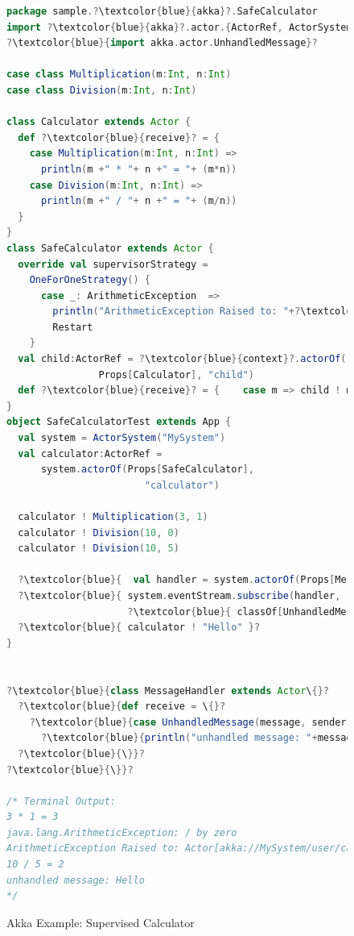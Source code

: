 \begin{figure}[p]

  \begin{lstlisting}[language=scala,   escapechar=?]
package sample.?\textcolor{blue}{akka}?.SafeCalculator
import ?\textcolor{blue}{akka}?.actor.{ActorRef, ActorSystem, Props, Actor}
?\textcolor{blue}{import akka.actor.UnhandledMessage}?

case class Multiplication(m:Int, n:Int)
case class Division(m:Int, n:Int)

class Calculator extends Actor {
  def ?\textcolor{blue}{receive}? = {
    case Multiplication(m:Int, n:Int) =>
      println(m +" * "+ n +" = "+ (m*n))
    case Division(m:Int, n:Int) =>
      println(m +" / "+ n +" = "+ (m/n))
  }
}
class SafeCalculator extends Actor {
  override val supervisorStrategy =
    OneForOneStrategy() {
      case _: ArithmeticException  =>
        println("ArithmeticException Raised to: "+?\textcolor{blue}{self}?)
        Restart
    }
  val child:ActorRef = ?\textcolor{blue}{context}?.actorOf(
  				Props[Calculator], "child")
  def ?\textcolor{blue}{receive}? = {    case m => child ! m  }
}
object SafeCalculatorTest extends App {
  val system = ActorSystem("MySystem")
  val calculator:ActorRef = 
      system.actorOf(Props[SafeCalculator],
                        "calculator")

  calculator ! Multiplication(3, 1)
  calculator ! Division(10, 0)
  calculator ! Division(10, 5)
  
  ?\textcolor{blue}{  val handler = system.actorOf(Props[MessageHandler])}?
  ?\textcolor{blue}{ system.eventStream.subscribe(handler, }?
                     ?\textcolor{blue}{ classOf[UnhandledMessage]);  }?
  ?\textcolor{blue}{ calculator ! "Hello" }?
}


?\textcolor{blue}{class MessageHandler extends Actor\{}?
  ?\textcolor{blue}{def receive = \{}?
    ?\textcolor{blue}{case UnhandledMessage(message, sender, recipient) =>}?
      ?\textcolor{blue}{println("unhandled message: "+message);}?
  ?\textcolor{blue}{\}}?
?\textcolor{blue}{\}}?

/* Terminal Output:
3 * 1 = 3
java.lang.ArithmeticException: / by zero
ArithmeticException Raised to: Actor[akka://MySystem/user/calculator]
10 / 5 = 2
unhandled message: Hello
*/


    \end{lstlisting}
  \caption{Akka Example: Supervised Calculator}
  \vspace*{2 in}
  \label{akka:supervisedcalculator}
\end{figure}


